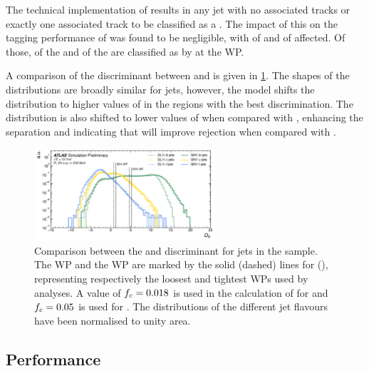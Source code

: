 The technical implementation of \GNN results in any jet with no associated tracks or exactly one associated track to be classified as a \ljet.
The impact of this on the tagging performance of \GNN was found to be negligible, with  of \ttbarbjets and  of \Zprimebjets affected.
Of those,  of the \ttbarbjets and  of the \Zprimebjets are classified as \ljets by \DLr at the  \ttbar WP.

A comparison of the \btag discriminant \Db between \DLr and \GNN is given in \cref{fig:ttbar_btag_disc}. 
The shapes of the distributions are broadly similar for \bcl jets, however, the \GNN model shifts the \bjet distribution to higher values of \Db in the regions with the best discrimination.
The \GNN \cjet distribution is also shifted to lower values of \Db when compared with \DLr, enhancing the separation and indicating that \GNN will improve \cjet rejection when compared with \DLr.

\begin{figure}[!htb]
    \centering
    \includegraphics[width=0.6\textwidth]{chapters/gnn_tagger/figs/results/main/ttbar/ttbar_score_DL1r_GN120220509_btag.pdf}
    \caption{Comparison between the \DLr and \GNN \btag discriminant \Db for jets in the \ttbar sample.
    The  WP and the  WP are marked by the solid (dashed) lines for \GNN (\DLr), representing respectively the loosest and tightest WPs used by analyses.
    A value of $f_c = 0.018$ is used in the calculation of \Db for \DLr and $f_c = 0.05$ is used for \GNN. The distributions of the different jet flavours have been normalised to unity area.}
    \label{fig:ttbar_btag_disc}
\end{figure}



\subsection{\texorpdfstring{\btagging}{b-tagging} Performance}\label{sec:gnn_btag_perf}

